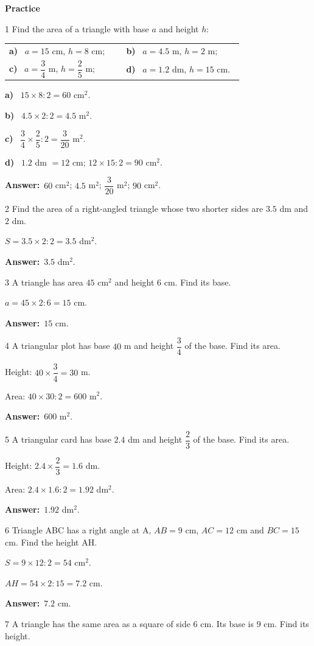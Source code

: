 \documentclass[11pt]{article}
\makeatletter
\newif\ifsol \solfalse
\renewcommand{\arraystretch}{1.35}
\providecommand{\AnsWord}{Đáp số}
\newcommand{\dapso}[1]{\par\textbf{\AnsWord:}\ #1}
\newcommand{\probsol}[1]{%
  \begin{lrbox}{\solmeasure}\begin{minipage}{\dimexpr\linewidth-24pt\relax}#1\end{minipage}\end{lrbox}%
  \ifsol
    \begin{solbox}#1\end{solbox}%
  \else
    \setlength{\solht}{\dimexpr\ht\solmeasure+\dp\solmeasure+0.85cm\relax}%
    \ifdim\solht<1.35cm\setlength{\solht}{1.35cm}\fi
    \begin{tcolorbox}[colback=white,colframe=Line,boxrule=0.8pt,arc=5pt,
      left=8pt,right=8pt,top=4pt,bottom=4pt,height=\solht]{\footnotesize\color{Slate}\itshape\WorkWord}\end{tcolorbox}%
  \fi}
\newcommand{\dividerbar}[1]{\par\vspace{0.6em}\noindent
  \begin{tcolorbox}[enhanced,frame hidden,interior hidden,borderline west={5pt}{0pt}{ProbBlue},
    colback=white,left=12pt,right=12pt,top=5pt,bottom=5pt,arc=4pt]
  {\large\bfseries\color{ProbBlue} #1}\end{tcolorbox}\vspace{0.4em}}
\newcommand{\pa}[1]{\textbf{#1)}\ }
\newenvironment{cols2}{\par\vspace{3pt}\noindent\setlength{\tabcolsep}{0pt}\renewcommand{\arraystretch}{1.3}%
  \begin{tabular}{@{}>{\raggedright\arraybackslash\rule{0pt}{4.4ex}}p{0.48\linewidth}<{\rule[-2.3ex]{0pt}{0pt}}@{\hspace{0.03\linewidth}}>{\raggedright\arraybackslash\rule{0pt}{4.4ex}}p{0.48\linewidth}<{\rule[-2.3ex]{0pt}{0pt}}@{}}}%
  {\end{tabular}\par}
\newcommand{\gap}{\vspace{0.3cm}}
\def\WorkWord{Your work:}
\def\AnsWord{Answer}
\makeatother
\begin{document}
\dividerbar{Practice}
\begin{probbox}{1}{\relax}
Find the area of a triangle with base $a$ and height $h$:
\begin{cols2}
\pa{a} $a=15$ cm, $h=8$ cm; & \pa{b} $a=4.5$ m, $h=2$ m;\\
\pa{c} $a=\dfrac34$ m, $h=\dfrac25$ m; & \pa{d} $a=1.2$ dm, $h=15$ cm.
\end{cols2}
\end{probbox}
\probsol{
\pa{a} $15\times8:2=60$ cm$^2$.\par \pa{b} $4.5\times2:2=4.5$ m$^2$.\par \pa{c} $\dfrac34\times\dfrac25:2=\dfrac3{20}$ m$^2$.\par \pa{d} $1.2$ dm $=12$ cm; $12\times15:2=90$ cm$^2$.
\dapso{$60$ cm$^2$; $4.5$ m$^2$; $\dfrac3{20}$ m$^2$; $90$ cm$^2$.}}
\gap
\begin{probbox}{2}{\relax}
Find the area of a right-angled triangle whose two shorter sides are $3.5$ dm and $2$ dm.
\end{probbox}
\probsol{
$S=3.5\times2:2=3.5$ dm$^2$.
\dapso{$3.5$ dm$^2$.}}
\gap
\begin{probbox}{3}{\relax}
A triangle has area $45$ cm$^2$ and height $6$ cm. Find its base.
\end{probbox}
\probsol{
$a=45\times2:6=15$ cm.
\dapso{$15$ cm.}}
\gap
\begin{probbox}{4}{\relax}
A triangular plot has base $40$ m and height $\dfrac34$ of the base. Find its area.
\end{probbox}
\probsol{
Height: $40\times\dfrac34=30$ m.\par Area: $40\times30:2=600$ m$^2$.
\dapso{$600$ m$^2$.}}
\gap
\begin{probbox}{5}{\relax}
A triangular card has base $2.4$ dm and height $\dfrac23$ of the base. Find its area.
\end{probbox}
\probsol{
Height: $2.4\times\dfrac23=1.6$ dm.\par Area: $2.4\times1.6:2=1.92$ dm$^2$.
\dapso{$1.92$ dm$^2$.}}
\gap
\begin{probbox}{6}{\relax}
Triangle ABC has a right angle at A, $AB=9$ cm, $AC=12$ cm and $BC=15$ cm. Find the height AH.
\end{probbox}
\probsol{
$S=9\times12:2=54$ cm$^2$.\par $AH=54\times2:15=7.2$ cm.
\dapso{$7.2$ cm.}}
\gap
\begin{probbox}{7}{\relax}
A triangle has the same area as a square of side $6$ cm. Its base is $9$ cm. Find its height.
\end{probbox}
\end{document}
